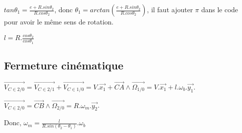 $tan\theta_1=\frac{e+R.sin\theta_2}{R.cos\theta_2}$, donc $\theta_1=arctan\left(\frac{e+R.sin\theta_2}{R.cos\theta_2}\right)$, il faut ajouter $\pi$ dans le code pour avoir le même sens de rotation.

$l=R.\frac{cos\theta_2}{cos\theta_1}$

\subsection{Fermeture cinématique}

$\overrightarrow{V_{C\in 2/0}}=\overrightarrow{V_{C\in 2/1}}+\overrightarrow{V_{C\in 1/0}}=V.\overrightarrow{x_1}+\overrightarrow{CA}\wedge \overrightarrow{\Omega_{1/0}}=V.\overrightarrow{x_1}+l.\omega_b.\overrightarrow{y_1}$.

$\overrightarrow{V_{C\in 2/0}}=\overrightarrow{CB}\wedge \overrightarrow{\Omega_{2/0}}=R.\omega_m.\overrightarrow{y_2}$.

Donc, $\omega_m=\frac{l}{R.sin(\theta_2-\theta_1)}.\omega_b$

